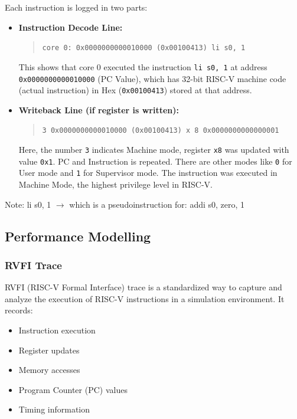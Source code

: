 \documentclass[12pt, a4paper]{article}
\begin{document}
Each instruction is logged in two parts:
\begin{itemize}
  \item \textbf{Instruction Decode Line:}
  \begin{quote}
    \texttt{core   0: 0x0000000000010000 (0x00100413) li s0, 1}
  \end{quote}
  This shows that core 0 executed the instruction \texttt{li s0, 1} at address \texttt{0x0000000000010000} (PC Value), which has 32-bit RISC-V machine code (actual instruction) in Hex (\texttt{0x00100413}) stored at that address.

  \item \textbf{Writeback Line (if register is written):}
  \begin{quote}
    \texttt{3 0x0000000000010000 (0x00100413) x 8 0x0000000000000001}
  \end{quote}
  Here, the number \texttt{3} indicates Machine mode, register \texttt{x8} was updated with value \texttt{0x1}. PC and Instruction is repeated. There are other modes like \texttt{0} for User mode and \texttt{1} for Supervisor mode. The instruction was executed in Machine Mode, the highest privilege level in RISC-V.
\end{itemize}

Note: 
li s0, 1  $\rightarrow$ which is a pseudoinstruction for: addi s0, zero, 1

\subsection{Performance Modelling}

\subsubsection{RVFI Trace}

RVFI (RISC-V Formal Interface) trace is a standardized way to capture and analyze the execution of RISC-V instructions in a simulation environment. It records:

\begin{itemize}[nosep]
    \item Instruction execution
    \item Register updates
    \item Memory accesses
    \item Program Counter (PC) values
    \item Timing information
\end{itemize}
\end{document}
